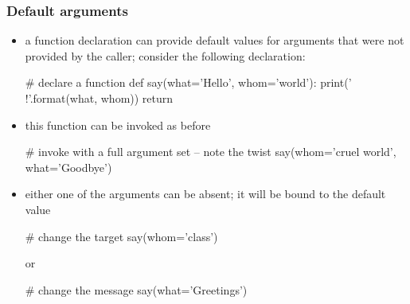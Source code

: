 \begin{frame}[fragile]
%
  \frametitle{Default arguments}
%
  \begin{itemize}
%
  \item a function declaration can provide default values for arguments that were not provided by
    the caller; consider the following declaration:
    \begin{ipython}{}
      # declare a function
      def say(what='Hello', whom='world'):
          print('{} {}!'.format(what, whom))
          return
    \end{ipython}
%
    \item this function can be invoked as before
    \begin{ipython}{}
      # invoke with a full argument set -- note the twist
      say(whom='cruel world', what='Goodbye')
    \end{ipython}
%
  \item either one of the arguments can be absent; it will be bound to the default value
    \begin{ipython}{}
      # change the target
      say(whom='class')
    \end{ipython}
    or
    \begin{ipython}{}
      # change the message
      say(what='Greetings')
    \end{ipython}
%
  \end{itemize}
%
\end{frame}

